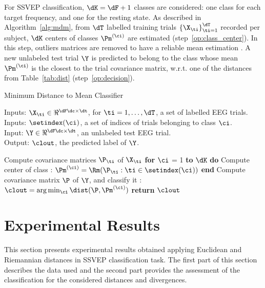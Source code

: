 {For SSVEP classification, $\dK = \dF + 1$ classes are considered: one class for each target frequency, and one for the resting state.
As described in Algorithm~\ref{alg:mdm}, from $\dT$ labelled training trials $ \left\{ \X_{\ti} \right\}_{\ti=1}^{\dT}$ recorded per subject, $\dK$ centers of classes $\Pm^{(\ci)}$ are estimated (step~\ref{op:class_center}). 
In this step, outliers matrices are removed to have a reliable mean estimation \cite{barachant2013riemannian}.
A new unlabeled test trial $\Y$ is predicted to belong to the class whose mean $\Pm^{(\ci)}$ is the closest to the trial covariance matrix, w.r.t. one of the distances from Table~\ref{tab:dist} (step~\ref{op:decision}).

\begin{algorithm}
\caption{Minimum Distance to Mean Classifier}
\label{alg:mdm}
	Inputs: $\X_{\ti} \in \Re^{\dF \dc\times\dt}$, for $\ti = 1, \ldots, \dT$, a set of labelled EEG trials. \\
	Inputs: $\setindex(\ci)$, a set of indices of trials belonging to class $\ci$. \\
	Input: $\Y \in \Re^{\dF \dc\times\dt}$, an unlabeled test EEG trial. \\
	Output: $\clout$, the predicted label of $\Y$.
	\begin{algorithmic}[1]
	\State Compute covariance matrices $\P_{\ti}$ of $\X_\ti$ 
	\State \textbf{for} $\ci$ = 1 \textbf{to} $\dK$ \textbf{do}
	\State \quad Compute center of class : $\Pm^{(\ci)}=\Rm(\P_{\ti}:\ti \in \setindex(\ci))$
	\label{op:class_center}
	\State \textbf{end}
	\State Compute covariance matrix $\P$ of $\Y$, and classify it : $\clout = \arg \min_{\ci} \dist(\P, \Pm^{(\ci)})$
	\label{op:decision}
	\State \textbf{return} $\clout$
	\end{algorithmic}
\end{algorithm}


\section{Experimental Results}
\label{sec:expresults}
This section presents experimental results obtained applying Euclidean and Riemannian distances in SSVEP classification task. 
The first part of this section describes the data used and the second part provides the assessment of the classification for the considered distances and divergences. %

}
